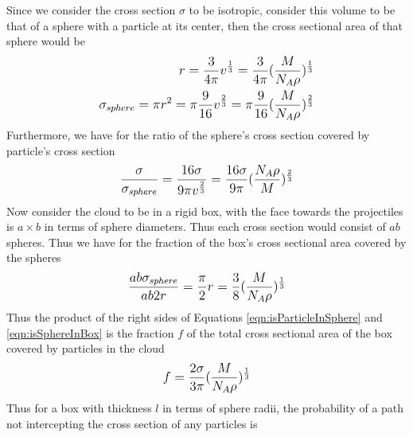 \documentclass[12pt]{article}
\begin{document}
Since we consider the cross section $\sigma$ to be isotropic, consider this volume to be that of a sphere with a particle at its center, then the cross sectional area of that sphere would be 
\begin{equation}
\begin{split}
\mathlarger{
r = \frac{3}{4\pi}v^{\frac{1}{3}} = \frac{3}{4\pi}(\frac{M}{N_A\rho})^{\frac{1}{3}} 
}\\
\mathlarger{
\sigma_{sphere} = \pi r^2 = \pi\frac{9}{16}v^{\frac{2}{3}} = \pi\frac{9}{16}(\frac{M}{N_A\rho})^{\frac{2}{3}}
}\\
\end{split}
\end{equation}
Furthermore, we have for the ratio of the sphere's cross section covered by particle's cross section 
\begin{equation}\label{eqn:isParticleInSphere}
\begin{split}    
\mathlarger{
\frac{\sigma}{\sigma_{sphere}} = \frac{16\sigma}{9\pi v^{\frac{2}{3}}} = 
\frac{16\sigma}{9\pi}(\frac{N_A\rho}{M})^{\frac{2}{3}}
}\\
\end{split}
\end{equation}
Now consider the cloud to be in a rigid box, with the face towards the projectiles is $a\times b$ in terms of sphere diameters. Thus each cross section would consist of $ab$ spheres. Thus we have for the fraction of the box's cross sectional area covered by the spheres 
\begin{equation}\label{eqn:isSphereInBox}
\begin{split}
\mathlarger{
\frac{ab\sigma_{sphere}}{ab2r} = \frac{\pi}{2} r = \frac{3}{8}(\frac{M}{N_A\rho})^{\frac{1}{3}} 
}\\
\end{split}
\end{equation}
Thus the product of the right sides of Equations \ref{eqn:isParticleInSphere} and \ref{eqn:isSphereInBox} is the fraction $f$ of the total cross sectional area of the box covered by particles in the cloud 
\begin{equation}\label{eqn:isParticleInBox}
\begin{split}
\mathlarger{
f = \frac{2\sigma}{3\pi}(\frac{M}{N_A\rho})^{\frac{1}{3}}
}\\
\end{split}
\end{equation}
Thus for a box with thickness $l$ in terms of sphere radii, the probability of a path not intercepting the cross section of any particles is 
\end{document}
